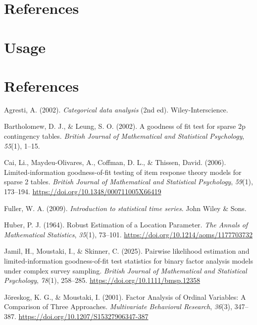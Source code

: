 \documentclass[
  letterpaper,
  DIV=11,
  numbers=noendperiod]{scrartcl}
\newlength{\cslhangindent}
\newenvironment{CSLReferences}[2] %
 {\begin{list}{}{%
  \setlength{\itemindent}{0pt}
  \setlength{\leftmargin}{0pt}
  \setlength{\parsep}{0pt}
  \ifodd #1
   \setlength{\leftmargin}{\cslhangindent}
   \setlength{\itemindent}{-1\cslhangindent}
  \fi
  \setlength{\itemsep}{#2\baselineskip}}}
 {\end{list}}
\begin{document}
\section{References}\label{references}

\section{Usage}\label{usage}

\section*{References}\label{references-1}

\label{refs}
\begin{CSLReferences}{1}{0}
Agresti, A. (2002). \emph{Categorical data analysis} (2nd ed).
Wiley-Interscience.

Bartholomew, D. J., \& Leung, S. O. (2002). A goodness of fit test for
sparse 2p contingency tables. \emph{British Journal of Mathematical and
Statistical Psychology}, \emph{55}(1), 1--15.

Cai, Li., Maydeu-Olivares, A., Coffman, D. L., \& Thissen, David.
(2006). Limited-information goodness-of-fit testing of item response
theory models for sparse 2 tables. \emph{British Journal of Mathematical
and Statistical Psychology}, \emph{59}(1), 173--194.
\url{https://doi.org/10.1348/000711005X66419}

Fuller, W. A. (2009). \emph{Introduction to statistical time series}.
John Wiley \& Sons.

Huber, P. J. (1964). Robust {Estimation} of a {Location Parameter}.
\emph{The Annals of Mathematical Statistics}, \emph{35}(1), 73--101.
\url{https://doi.org/10.1214/aoms/1177703732}

Jamil, H., Moustaki, I., \& Skinner, C. (2025). Pairwise likelihood
estimation and limited-information goodness-of-fit test statistics for
binary factor analysis models under complex survey sampling.
\emph{British Journal of Mathematical and Statistical Psychology},
\emph{78}(1), 258--285. \url{https://doi.org/10.1111/bmsp.12358}

Jöreskog, K. G., \& Moustaki, I. (2001). Factor {Analysis} of {Ordinal
Variables}: {A Comparison} of {Three Approaches}. \emph{Multivariate
Behavioral Research}, \emph{36}(3), 347--387.
\url{https://doi.org/10.1207/S15327906347-387}


\end{CSLReferences}
\end{document}
